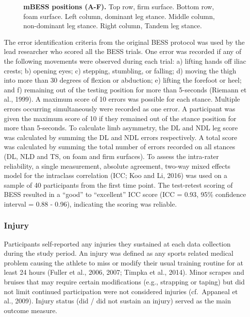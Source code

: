 \documentclass[utf8]{frontiersHLTH}
\begin{document}
\begin{figure}[!h]
\caption{{\bf mBESS positions (A-F).}
Top row, firm surface. Bottom row, foam surface. Left column, dominant leg stance. Middle column, non-dominant leg stance. Right column, Tandem leg stance.}
\label{fig:fig2}
\end{figure}

The error identification criteria from the original BESS protocol was
used by the lead researcher who scored all the BESS trials. One error
was recorded if any of the following movements were observed during each
trial: a) lifting hands off iliac crests; b) opening eyes; c) stepping,
stumbling, or falling; d) moving the thigh into more than 30 degrees of
flexion or abduction; e) lifting the forefoot or heel; and f) remaining
out of the testing position for more than 5-seconds (Riemann et al.,
1999). A maximum score of 10 errors was possible for each stance.
Multiple errors occurring simultaneously were recorded as one error. A
participant was given the maximum score of 10 if they remained out of
the stance position for more than 5-seconds. To calculate limb
asymmetry, the DL and NDL leg score was calculated by summing the DL and
NDL errors respectively. A total score was calculated by summing the
total number of errors recorded on all stances (DL, NLD and TS, on foam
and firm surfaces). To assess the intra-rater reliability, a single
measurement, absolute agreement, two-way mixed effects model for the
intraclass correlation (ICC; Koo and Li, 2016) was used on a sample of
40 participants from the first time point. The test-retest scoring of
BESS resulted in a ``good'' to ``excellent'' ICC score (ICC = 0.93, 95\%
confidence interval = 0.88 - 0.96), indicating the scoring was reliable.

\hypertarget{injury}{%
\subsubsection*{Injury}\label{injury}}

Participants self-reported any injuries they sustained at each data
collection during the study period. An injury was defined as any sports
related medical problem causing the athlete to miss or modify their
usual training routine for at least 24 hours (Fuller et al., 2006, 2007;
Timpka et al., 2014). Minor scrapes and bruises that may require certain
modifications (e.g., strapping or taping) but did not limit continued
participation were not considered injuries (cf.~Appaneal et al., 2009).
Injury status (did / did not sustain an injury) served as the main
outcome measure.
\end{document}
